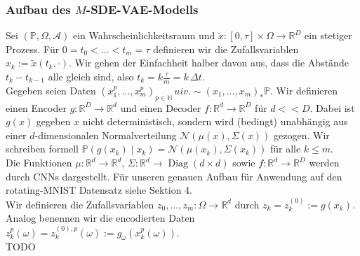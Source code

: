 \documentclass[12pt]{article}
\newcommand{\E}{\mathbb{E}}
\newcommand{\R}{\mathbb{R}}
\newcommand{\tx}{\widetilde{x}}
\newcommand{\bP}{\mathbb{P}}
\newcommand{\bmu}{\bm{\mu}}
\newcommand{\bsig}{\bm{\sigma}}
\newcommand{\N}{\mathbb{N}}
\begin{document}
	
	\newpage
	\subsubsection[Modell]{Aufbau des $M$-SDE-VAE-Modells}
	Sei $(\bP, \Omega, \mathcal{A})$ ein Wahrscheinlichkeitsraum und $\tx : [0,\tau] \times \Omega \rightarrow \R^D$ ein stetiger Prozess. Für $0=t_0<...<t_m=\tau$ definieren wir die Zufallsvariablen $x_k := \tx(t_k,\cdot)$. Wir gehen der Einfachheit halber davon aus, dass die Abstände $t_k-t_{k-1}$ alle gleich sind, also $t_k = k\frac{\tau}{m} = k \, \Delta t$.\\
	Gegeben seien Daten $(x_1^p,...,x_m^p)_{p \in \N}\, uiv. \sim (x_1,...,x_m)_*\bP$. Wir definieren einen Encoder $g: \R^D \rightarrow \R^d$ und einen Decoder $f: \R^d \rightarrow \R^D$ für $d<<D$. Dabei ist $g(x)$ gegeben $x$ nicht deterministisch, sondern wird (bedingt) unabhängig aus einer $d$-dimensionalen Normalverteilung $\mathcal{N}(\mu(x),\Sigma(x))$ gezogen. Wir schreiben formell $\bP(g(x_k) \mid x_k) = \mathcal{N}(\mu(x_k),\Sigma(x_k))$ für alle $k \leq m$.\\
	Die Funktionen $\mu: \R^d \rightarrow \R^d$, $\Sigma: \R^d \rightarrow \operatorname{Diag}(d \times d)$ sowie $f: \R^d \rightarrow \R^D$ werden durch CNNs dargestellt. Für unseren genauen Aufbau für Anwendung auf den rotating-MNIST Datensatz siehe Sektion 4.\\
	Wir definieren die Zufallsvariablen $z_0,...,z_m : \Omega \rightarrow \R^{d}$ durch $z_k = z^{(0)}_k := g(x_k)$. Analog benennen wir die encodierten Daten $z_k^p(\omega) = z_k^{(0),p}(\omega) := g_\omega(x_k^p(\omega))$.\\
	TODO
	
	
	
	
	\newpage
\end{document}
